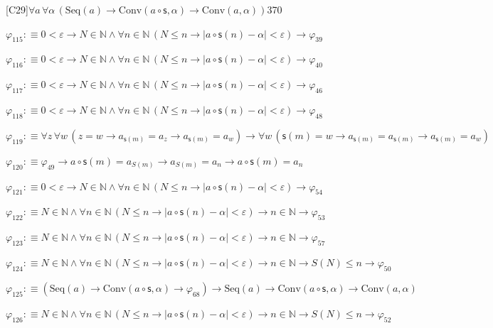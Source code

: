\begin{fullproof}{[C29]}{$\forall a\,\forall \alpha\,(\mathrm{Seq}(a) \to \mathrm{Conv}(a \circ \mathsf{s},\alpha) \to \mathrm{Conv}(a,\alpha))$}{370}
\begin{abbrevlist}
\item $\varphi_{115} :\equiv 0 < \varepsilon \to N \in \mathbb{N} \land \forall n \in \mathbb{N}\,(N \leq n \to \lvert a \circ \mathsf{s}(n) - \alpha \rvert < \varepsilon) \to \varphi_{39}$
\item $\varphi_{116} :\equiv 0 < \varepsilon \to N \in \mathbb{N} \land \forall n \in \mathbb{N}\,(N \leq n \to \lvert a \circ \mathsf{s}(n) - \alpha \rvert < \varepsilon) \to \varphi_{40}$
\item $\varphi_{117} :\equiv 0 < \varepsilon \to N \in \mathbb{N} \land \forall n \in \mathbb{N}\,(N \leq n \to \lvert a \circ \mathsf{s}(n) - \alpha \rvert < \varepsilon) \to \varphi_{46}$
\item $\varphi_{118} :\equiv 0 < \varepsilon \to N \in \mathbb{N} \land \forall n \in \mathbb{N}\,(N \leq n \to \lvert a \circ \mathsf{s}(n) - \alpha \rvert < \varepsilon) \to \varphi_{48}$
\item $\varphi_{119} :\equiv \forall z\,\forall w\,(z = w \to a_{\mathsf{s}(m)} = a_{z} \to a_{\mathsf{s}(m)} = a_{w}) \to \forall w\,(\mathsf{s}(m) = w \to a_{\mathsf{s}(m)} = a_{\mathsf{s}(m)} \to a_{\mathsf{s}(m)} = a_{w})$
\item $\varphi_{120} :\equiv \varphi_{49} \to a \circ \mathsf{s}(m) = a_{S(m)} \to a_{S(m)} = a_{n} \to a \circ \mathsf{s}(m) = a_{n}$
\item $\varphi_{121} :\equiv 0 < \varepsilon \to N \in \mathbb{N} \land \forall n \in \mathbb{N}\,(N \leq n \to \lvert a \circ \mathsf{s}(n) - \alpha \rvert < \varepsilon) \to \varphi_{54}$
\item $\varphi_{122} :\equiv N \in \mathbb{N} \land \forall n \in \mathbb{N}\,(N \leq n \to \lvert a \circ \mathsf{s}(n) - \alpha \rvert < \varepsilon) \to n \in \mathbb{N} \to \varphi_{53}$
\item $\varphi_{123} :\equiv N \in \mathbb{N} \land \forall n \in \mathbb{N}\,(N \leq n \to \lvert a \circ \mathsf{s}(n) - \alpha \rvert < \varepsilon) \to n \in \mathbb{N} \to \varphi_{57}$
\item $\varphi_{124} :\equiv N \in \mathbb{N} \land \forall n \in \mathbb{N}\,(N \leq n \to \lvert a \circ \mathsf{s}(n) - \alpha \rvert < \varepsilon) \to n \in \mathbb{N} \to S(N) \leq n \to \varphi_{50}$
\item $\varphi_{125} :\equiv (\mathrm{Seq}(a) \to \mathrm{Conv}(a \circ \mathsf{s},\alpha) \to \varphi_{68}) \to \mathrm{Seq}(a) \to \mathrm{Conv}(a \circ \mathsf{s},\alpha) \to \mathrm{Conv}(a,\alpha)$
\item $\varphi_{126} :\equiv N \in \mathbb{N} \land \forall n \in \mathbb{N}\,(N \leq n \to \lvert a \circ \mathsf{s}(n) - \alpha \rvert < \varepsilon) \to n \in \mathbb{N} \to S(N) \leq n \to \varphi_{52}$

\end{abbrevlist}
\end{fullproof}

